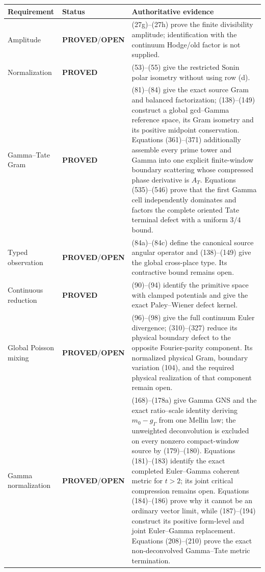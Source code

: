 \documentclass[11pt]{article}
\newcommand{\PROVED}{\textcolor{green!45!black}{\textbf{PROVED}}}
\newcommand{\OPEN}{\textcolor{red!70!black}{\textbf{OPEN}}}
\begin{document}
\begin{center}
\begin{tabular}{p{}p{}p{}}
\hline
Requirement & Status & Authoritative evidence \\
\hline
Amplitude & \PROVED/\OPEN & (27g)--(27h) prove the finite divisibility
amplitude; identification with the continuum Hodge/old factor is not supplied.
\\
Normalization & \PROVED & (53)--(55) give the restricted Sonin polar
isometry without using row (d). \\
Gamma--Tate Gram & \PROVED & (81)--(84) give the exact source Gram and
balanced factorization; (138)--(149) construct a global gcd--Gamma reference
space, its Gram isometry and its positive midpoint conservation.  Equations
(361)--(371) additionally assemble every prime tower and Gamma into one
explicit finite-window boundary scattering whose compressed phase derivative
is $A_T$.  Equations (535)--(546) prove that the first Gamma cell
independently dominates and factors the complete oriented Tate terminal
defect with a uniform \(3/4\) bound. \\
Typed observation & \PROVED/\OPEN & (84a)--(84c) define the canonical source
angular operator and (138)--(149) give the global cross-place type.  Its
contractive bound remains open.
\\
Continuous reduction & \PROVED & (90)--(94) identify the primitive space
with clamped potentials and give the exact Paley--Wiener defect kernel. \\
Global Poisson mixing & \PROVED/\OPEN & (96)--(98) give the full continuum
Euler divergence; (310)--(327) reduce its physical boundary defect to the
opposite Fourier-parity component.  Its normalized physical Gram, boundary
variation (104), and the required physical realization of that component
remain open. \\
Gamma normalization & \PROVED/\OPEN & (168)--(178a) give Gamma GNS and the
exact ratio--scale identity deriving $m_0-g_\Gamma$ from one Mellin law;
the unweighted deconvolution is excluded on every nonzero compact-window
source by (179)--(180).  Equations (181)--(183) identify the exact completed
Euler--Gamma coherent metric for $t>2$; its joint critical compression remains
open.  Equations (184)--(186) prove why it cannot be an ordinary vector
limit, while (187)--(194) construct its positive form-level and joint
Euler--Gamma replacement.  Equations (208)--(210) prove the exact
non-deconvolved Gamma--Tate metric termination. \\

\end{tabular}
\end{center}
\end{document}
